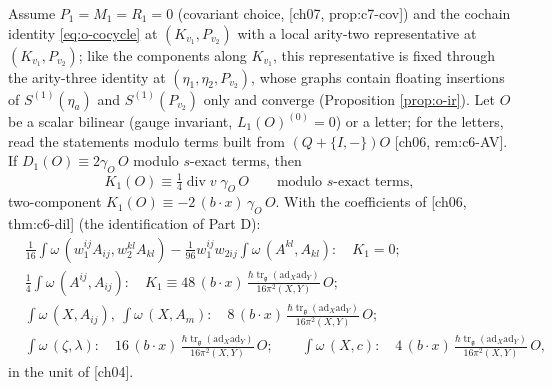 \begin{theorem}[$K_1$ from $D_1$]
\label{thm:o-KD}
Assume $P_1=M_1=R_1=0$ (covariant choice, [ch07, prop:c7-cov]) and the cochain identity \eqref{eq:o-cocycle} at $(K_{v_1},P_{v_2})$ with a local arity-two representative at $(K_{v_1},P_{v_2})$; like the components along $K_{v_1}$, this representative is fixed through the arity-three identity at $(\eta_1,\eta_2,P_{v_2})$, whose graphs contain floating insertions of $S^{(1)}(\eta_a)$ and $S^{(1)}(P_{v_2})$ only and converge (Proposition \ref{prop:o-ir}). Let $O$ be a scalar bilinear (gauge invariant, $L_1(O)^{(0)}=0$) or a letter; for the letters, read the statements modulo terms built from $(Q+\{I,-\})O$ [ch06, rem:c6-AV]. If $D_1(O)\equiv2\gamma_O\,O$ modulo $s$-exact terms, then
\begin{equation}
K_1(O)\equiv\tfrac14\operatorname{div}v\;\gamma_O\,O\qquad\text{modulo }s\text{-exact terms},
\label{eq:o-KD}
\end{equation}
two-component $K_1(O)\equiv-2\,(b\cdot x)\,\gamma_O\,O$. With the coefficients of [ch06, thm:c6-dil] (the identification of Part D):
\[
\begin{aligned}
&\tfrac{1}{16}\int\omega\,(w_1^{ij}A_{ij},w_2^{kl}A_{kl})-\tfrac1{96}w_1^{ij}w_{2ij}\int\omega\,(A^{kl},A_{kl}):\quad K_1=0;\\
&\tfrac14\int\omega\,(A^{ij},A_{ij}):\quad K_1\equiv48\,(b\cdot x)\,\tfrac{\hbar\operatorname{tr}_{\mathfrak g}(\mathrm{ad}_X\mathrm{ad}_Y)}{16\pi^2(X,Y)}\,O;\\
&\int\omega\,(X,A_{ij}),\ \int\omega\,(X,A_m):\quad 8\,(b\cdot x)\,\tfrac{\hbar\operatorname{tr}_{\mathfrak g}(\mathrm{ad}_X\mathrm{ad}_Y)}{16\pi^2(X,Y)}\,O;\\
&\int\omega\,(\zeta,\lambda):\quad 16\,(b\cdot x)\,\tfrac{\hbar\operatorname{tr}_{\mathfrak g}(\mathrm{ad}_X\mathrm{ad}_Y)}{16\pi^2(X,Y)}\,O;\qquad \int\omega\,(X,c):\quad 4\,(b\cdot x)\,\tfrac{\hbar\operatorname{tr}_{\mathfrak g}(\mathrm{ad}_X\mathrm{ad}_Y)}{16\pi^2(X,Y)}\,O,
\end{aligned}
\]
in the unit of [ch04].
\end{theorem}

